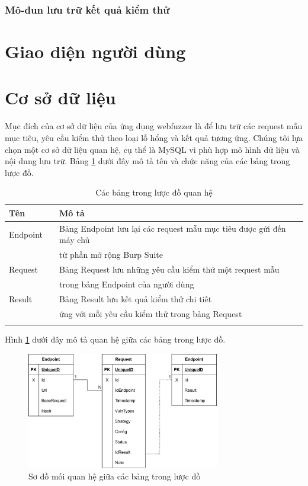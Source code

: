 \subsubsection{Mô-đun lưu trữ kết quả kiểm thử}
\section{Giao diện người dùng}
\section{Cơ sở dữ liệu}
Mục đích của cơ sở dữ liệu của ứng dụng webfuzzer là để lưu trữ các request mẫu mục tiêu, yêu cầu kiểm thử theo loại lỗ hổng và kết quả tương ứng. Chúng tôi lựa chọn một cơ sở dữ liệu quan hệ, cụ thể là MySQL vì phù hợp mô hình dữ liệu và nội dung lưu trữ. Bảng \ref{tab:db-tables} dưới đây mô tả tên và chức năng của các bảng trong lược đồ.
\begin{table}[ht]
    \centering
    \caption{Các bảng trong lược đồ quan hệ}
    \label{tab:db-tables}
    \begin{tabular}[ht]{lll}
        \toprule[1pt]\midrule[0.3pt]
            \textbf{Tên}& &\textbf{Mô tả}\\ 
        \midrule
            Endpoint& &Bảng Endpoint lưu lại các request mẫu mục tiêu được gửi đến máy chủ \\
            {}& &từ phần mở rộng Burp Suite\\
            \addlinespace
            Request& &Bảng Request lưu những yêu cầu kiểm thử một request mẫu \\
            {}& &trong bảng Endpoint của người dùng\\
            \addlinespace
            Result& &Bảng Result lưu kết quả kiểm thử chi tiết \\
            {}& &ứng với mỗi yêu cầu kiểm thử trong bảng Request\\
            \addlinespace
        \midrule[0.3pt]\bottomrule[1pt]
    \end{tabular}
\end{table}
\FloatBarrier
Hình \ref{fig:db-schema} dưới đây mô tả quan hệ giữa các bảng trong lược đồ.
\begin{figure}[H]
  \centering
    \includegraphics[width=0.75\textwidth,keepaspectratio=true]{images/database-design.png}
  \caption{Sơ đồ mối quan hệ giữa các bảng trong lược đồ}
  \label{fig:db-schema}
\end{figure}
